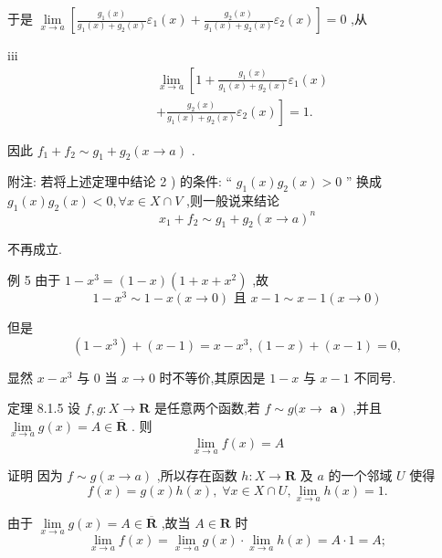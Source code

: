 于是 $\mathop{\lim }\limits_{{x \rightarrow  a}}\left\lbrack  {\frac{{g}_{1}\left( x\right) }{{g}_{1}\left( x\right)  + {g}_{2}\left( x\right) }{\varepsilon }_{1}\left( x\right)  + \frac{{g}_{2}\left( x\right) }{{g}_{1}\left( x\right)  + {g}_{2}\left( x\right) }{\varepsilon }_{2}\left( x\right) }\right\rbrack   = 0$ ,从

iii
\begin{align*}
	&\mathop{\lim }\limits_{{x \rightarrow  a}}\left\lbrack  {1 + \frac{{g}_{1}\left( x\right) }{{g}_{1}\left( x\right)  + {g}_{2}\left( x\right) }{\varepsilon }_{1}\left( x\right) }\right.\\
	&\left. {+\frac{{g}_{2}\left( x\right) }{{g}_{1}\left( x\right)  + {g}_{2}\left( x\right) }{\varepsilon }_{2}\left( x\right) }\right\rbrack   = 1.
\end{align*}

因此 ${f}_{1} + {f}_{2} \sim  {g}_{1} + {g}_{2}\left( {x \rightarrow  a}\right)$ .

附注: 若将上述定理中结论 2 ) 的条件: “ ${g}_{1}\left( x\right) {g}_{2}\left( x\right)  > 0$ ” 换成 ${g}_{1}\left( x\right) {g}_{2}\left( x\right)  < 0,\forall x \in  X \cap  V$ ,则一般说来结论
$${x}_{1} + {f}_{2} \sim  {g}_{1} + {g}_{2}{\left( x \rightarrow  a\right) }^{n}$$

不再成立.

例 5 由于 $1 - {x}^{3} = \left( {1 - x}\right) \left( {1 + x + {x}^{2}}\right)$ ,故
$$1 - {x}^{3} \sim  1 - x\left( {x \rightarrow  0}\right) \text{ 且 }x - 1 \sim  x - 1\left( {x \rightarrow  0}\right)$$

但是
$$\left( {1 - {x}^{3}}\right)  + \left( {x - 1}\right)  = x - {x}^{3},\left( {1 - x}\right)  + \left( {x - 1}\right)  = 0,$$

显然 $x - {x}^{3}$ 与 0 当 $x \rightarrow  0$ 时不等价,其原因是 $1 - x$ 与 $x - 1$ 不同号.

定理 8.1.5 设 $f,g : X \rightarrow  \mathbf{R}$ 是任意两个函数,若 $f \sim  g(x \rightarrow$  $\left. \mathbf{a}\right)$ ,并且 $\mathop{\lim }\limits_{{x \rightarrow  a}}g\left( x\right)  = A \in  \overline{\mathbf{R}}$ . 则
$$\mathop{\lim }\limits_{{x \rightarrow  a}}f\left( x\right)  = A$$

证明 因为 $f \sim  g\left( {x \rightarrow  a}\right)$ ,所以存在函数 $h : X \rightarrow  \mathbf{R}$ 及 $a$ 的一个邻域 $U$ 使得
$$f\left( x\right)  = g\left( x\right) h\left( x\right) ,\;\forall x \in  X \cap  U,\mathop{\lim }\limits_{{x \rightarrow  a}}h\left( x\right)  = 1.$$

由于 $\mathop{\lim }\limits_{{x \rightarrow  a}}g\left( x\right)  = A \in  \overline{\mathbf{R}}$ ,故当 $A \in  \mathbf{R}$ 时
$$\mathop{\lim }\limits_{{x \rightarrow  a}}f\left( x\right)  = \mathop{\lim }\limits_{{x \rightarrow  a}}g\left( x\right)  \cdot  \mathop{\lim }\limits_{{x \rightarrow  a}}h\left( x\right)  = A \cdot  1 = A;$$

